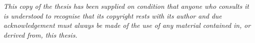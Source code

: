 
\begin{unicopyright}
\textit{This copy of the thesis has been supplied on condition that anyone who consults it is understood to recognise that its copyright rests with its author and due acknowledgement must always be made of the use of any material contained in, or derived from, this thesis.}
\end{unicopyright}
